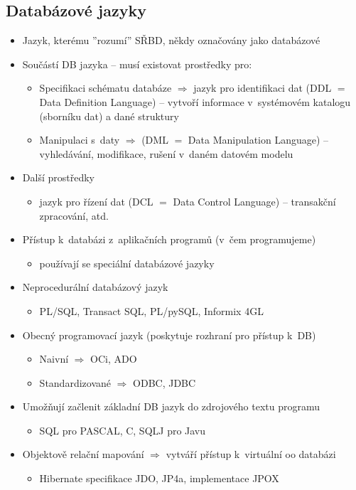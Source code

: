 \documentclass[a4paper,10pt]{article}
\newcommand{\tedy}{$\Rightarrow$ }
\begin{document}
			\subsection{Databázové jazyky}
				\begin{itemize}
					\item Jazyk, kterému ''rozumí'' SŘBD, někdy označovány jako databázové
					\item Součástí DB jazyka -- musí existovat prostředky pro:
					\begin{itemize}
						\item Specifikaci schématu databáze \tedy jazyk pro identifikaci dat (DDL $=$ Data Definition Language) -- vytvoří informace v~systémovém katalogu (sborníku dat) a dané struktury
						\item Manipulaci s~daty \tedy (DML $=$ Data Manipulation Language) -- vyhledávání, modifikace, rušení v~daném datovém modelu
					\end{itemize}

					\item Další prostředky
					\begin{itemize}
						\item jazyk pro řízení dat (DCL $=$ Data Control Language) -- transakční zpracování, atd.
					\end{itemize}

					\item Přístup k~databázi z~aplikačních programů (v~čem programujeme)
					\begin{itemize}
						\item používají se speciální databázové jazyky
					\end{itemize}
					
					\item Neprocedurální databázový jazyk
					\begin{itemize}
						\item PL/SQL, Transact SQL, PL/pySQL, Informix 4GL
					\end{itemize}
					\item Obecný programovací jazyk (poskytuje rozhraní pro přístup k~DB)
					\begin{itemize}
						\item Naivní \tedy OCi, ADO
						\item Standardizované \tedy ODBC, JDBC
					\end{itemize}

					\item Umožňují začlenit základní DB jazyk do zdrojového textu programu
					\begin{itemize}
						\item SQL pro PASCAL, C, SQLJ pro Javu
					\end{itemize}

					\item Objektově relační mapování \tedy vytváří přístup k~virtuální oo databázi
					\begin{itemize}
						\item Hibernate specifikace JDO, JP4a, implementace JPOX
					\end{itemize}
				\end{itemize}
\end{document}

